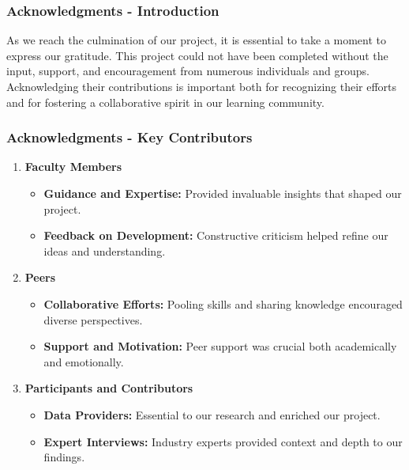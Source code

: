 \documentclass[aspectratio=169]{beamer}
\begin{document}
\begin{frame}[fragile]
    \frametitle{Acknowledgments - Introduction}
    As we reach the culmination of our project, it is essential to take a moment to express our gratitude. This project could not have been completed without the input, support, and encouragement from numerous individuals and groups. Acknowledging their contributions is important both for recognizing their efforts and for fostering a collaborative spirit in our learning community.
\end{frame}

\begin{frame}[fragile]
    \frametitle{Acknowledgments - Key Contributors}
    \begin{enumerate}
        \item \textbf{Faculty Members}
            \begin{itemize}
                \item \textbf{Guidance and Expertise:} Provided invaluable insights that shaped our project.
                \item \textbf{Feedback on Development:} Constructive criticism helped refine our ideas and understanding.
            \end{itemize}
        
        \item \textbf{Peers}
            \begin{itemize}
                \item \textbf{Collaborative Efforts:} Pooling skills and sharing knowledge encouraged diverse perspectives.
                \item \textbf{Support and Motivation:} Peer support was crucial both academically and emotionally.
            \end{itemize}
        
        \item \textbf{Participants and Contributors}
            \begin{itemize}
                \item \textbf{Data Providers:} Essential to our research and enriched our project.
                \item \textbf{Expert Interviews:} Industry experts provided context and depth to our findings.
            \end{itemize}
    \end{enumerate}
\end{frame}
\end{document}
